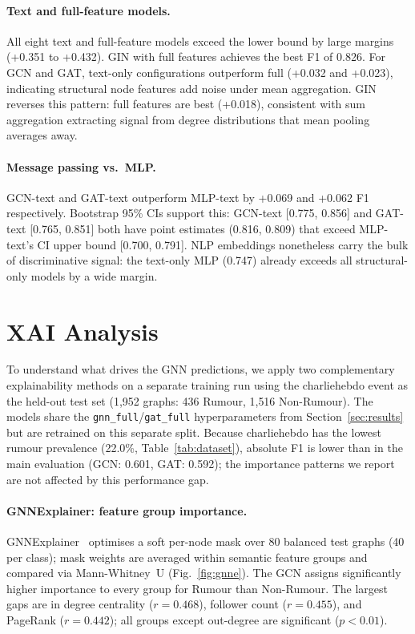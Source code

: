 \documentclass[runningheads]{llncs}
\begin{document}
\paragraph{Text and full-feature models.}
All eight text and full-feature models exceed the lower bound by large margins
(+0.351 to +0.432). GIN with full features achieves the best F1 of 0.826.
For GCN and GAT, text-only configurations outperform full (+0.032 and +0.023),
indicating structural node features add noise under mean aggregation.
GIN reverses this pattern: full features are best (+0.018), consistent with
sum aggregation extracting signal from degree distributions that mean pooling
averages away.

\paragraph{Message passing vs.\ MLP.}
GCN-text and GAT-text outperform MLP-text by +0.069 and +0.062 F1 respectively.
Bootstrap 95\% CIs support this: GCN-text [0.775, 0.856] and GAT-text
[0.765, 0.851] both have point estimates (0.816, 0.809) that exceed
MLP-text's CI upper bound [0.700, 0.791].
NLP embeddings nonetheless carry the bulk of discriminative signal: the
text-only MLP (0.747) already exceeds all structural-only models by a wide margin.

\section{XAI Analysis}
\label{sec:xai}

To understand what drives the GNN predictions, we apply two complementary
explainability methods on a separate training run using the charliehebdo event
as the held-out test set (1{,}952 graphs: 436 Rumour, 1{,}516 Non-Rumour).
The models share the \texttt{gnn\_full}/\texttt{gat\_full} hyperparameters from
Section~\ref{sec:results} but are retrained on this separate split.
Because charliehebdo has the lowest rumour prevalence (22.0\%,
Table~\ref{tab:dataset}), absolute F1 is lower than in the main evaluation
(GCN: 0.601, GAT: 0.592); the importance patterns we report are not affected
by this performance gap.

\paragraph{GNNExplainer: feature group importance.}
GNNExplainer~\cite{ying2019gnnexplainer} optimises a soft per-node mask over
80 balanced test graphs (40 per class); mask weights are averaged within semantic
feature groups and compared via Mann-Whitney~U (Fig.~\ref{fig:gnne}).
The GCN assigns significantly higher importance to every group for Rumour than
Non-Rumour. The largest gaps are in degree centrality ($r = 0.468$), follower
count ($r = 0.455$), and PageRank ($r = 0.442$); all groups except out-degree
are significant ($p < 0.01$).
\end{document}
